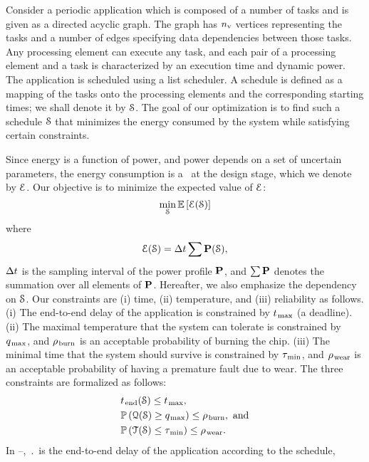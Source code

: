 Consider a periodic application which is composed of a number of tasks and is given as a directed acyclic graph.
The graph has ${n_\text{v}}$ vertices representing the tasks and a number of edges specifying data dependencies between those tasks.
Any processing element can execute any task, and each pair of a processing element and a task is characterized by an execution time and dynamic power.
The application is scheduled using a list scheduler.
A schedule is defined as a mapping of the tasks onto the processing elements and the corresponding starting times; we shall denote it by $\EuScript{S}$.
The goal of our optimization is to find such a schedule $\EuScript{S}$ that minimizes the energy consumed by the system while satisfying certain constraints.

Since energy is a function of power, and power depends on a set of uncertain parameters, the energy consumption is a \rv\ at the design stage, which we denote by $\EuScript{E}$.
Our objective is to minimize the expected value of $\EuScript{E}$:
\begin{equation} \elab{objective}
  \min_{\schedule} \expectation{\qoiE(\schedule)}
\end{equation}
where
\[
  \EuScript{E}(\EuScript{S}) = \Delta t \sum \mathbf{P}(\EuScript{S}),
\]
$\Delta t$ is the sampling interval of the power profile $\mathbf{P}$, and $\sum \mathbf{P}$ denotes the summation over all elements of $\mathbf{P}$.
Hereafter, we also emphasize the dependency on $\EuScript{S}$.
Our constraints are (i) time, (ii) temperature, and (iii) reliability as follows.
(i) The end-to-end delay of the application is constrained by $t_{\text{\kern0.1emmax}}$ (a deadline).
(ii) The maximal temperature that the system can tolerate is constrained by $q_{\text{\kern0.1emmax}}$, and $\rho_{\text{\kern0.1emburn}}$ is an acceptable probability of burning the chip.
(iii) The minimal time that the system should survive is constrained by $\tau_{\text{\kern0.1emmin}}$, and $\rho_{\text{\kern0.1emwear}}$ is an acceptable probability of having a premature fault due to wear.
The three constraints are formalized as follows:
\begin{align}
  & \period(\schedule) \leq \t_\maximal, \elab{timing-constraint} \\
  & \probabilityMeasure\left( \qoiQ(\schedule) \geq \q_\maximal \right) \leq \pr_\burn, \text{ and} \elab{thermal-constraint} \\
  & \probabilityMeasure\left( \qoiT(\schedule) \leq \T_\minimal \right) \leq \pr_\wear. \elab{reliability-constraint}
\end{align}
In --, $\period$ is the end-to-end delay of the application according to the schedule,

